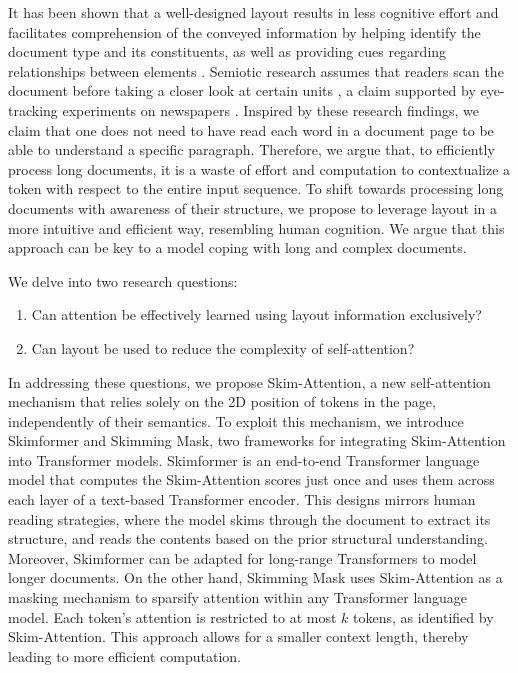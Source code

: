 It has been shown that a well-designed layout results in less cognitive effort \citep{kieras1978beyond, britton1982effects, olive2017processing} and facilitates comprehension of the conveyed information by helping identify the document type and its constituents, as well as providing cues regarding relationships between elements \citep{meyer1980use, wright1999psychology}. Semiotic research assumes that readers scan the document before taking a closer look at certain units \citep{kress1996reading}, a claim supported by eye-tracking experiments on newspapers \citep{leckner2012presentation}. Inspired by these research findings, we claim that one does not need to have read each word in a document page to be able to understand a specific paragraph. Therefore, we argue that, to efficiently process long documents, it is a waste of effort and computation to contextualize a token with respect to the entire input sequence. To shift towards processing long documents with awareness of their structure, we propose to leverage layout in a more intuitive and efficient way, resembling human cognition. We argue that this approach can be key to a model coping with long and complex documents.

We delve into two research questions:

\begin{enumerate}
    \item Can attention be effectively learned using layout information exclusively?
    \item Can layout be used to reduce the complexity of self-attention?
\end{enumerate}

In addressing these questions, we propose Skim-Attention, a new self-attention mechanism that relies solely on the 2D position of tokens in the page, independently of their semantics. To exploit this mechanism, we introduce Skimformer and Skimming Mask, two frameworks for integrating Skim-Attention into Transformer models. Skimformer is an end-to-end Transformer language model that computes the Skim-Attention scores just once and uses them across each layer of a text-based Transformer encoder. This designs mirrors human reading strategies, where the model skims through the document to extract its structure, and reads the contents based on the prior structural understanding. Moreover, Skimformer can be adapted for long-range Transformers to model longer documents. On the other hand, Skimming Mask uses Skim-Attention as a masking mechanism to sparsify attention within any Transformer language model. Each token's attention is restricted to at most $k$ tokens, as identified by Skim-Attention. This approach allows for a smaller context length, thereby leading to more efficient computation.

